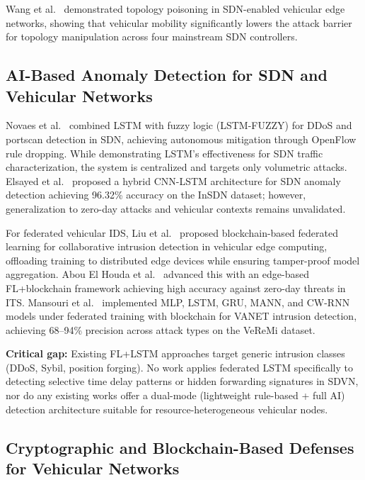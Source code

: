 \documentclass[12pt, a4paper]{report}
\begin{document}
Wang et al.~\cite{Wang2020Topology} demonstrated topology poisoning in SDN-enabled vehicular edge networks, showing that vehicular mobility significantly lowers the attack barrier for topology manipulation across four mainstream SDN controllers.

\subsection{AI-Based Anomaly Detection for SDN and Vehicular Networks}
\label{sec:ai_defense}

Novaes et al.~\cite{Novaes2020} combined LSTM with fuzzy logic (LSTM-FUZZY) for DDoS and portscan detection in SDN, achieving autonomous mitigation through OpenFlow rule dropping. While demonstrating LSTM's effectiveness for SDN traffic characterization, the system is centralized and targets only volumetric attacks. Elsayed et al.~\cite{Elsayed2021} proposed a hybrid CNN-LSTM architecture for SDN anomaly detection achieving 96.32\% accuracy on the InSDN dataset; however, generalization to zero-day attacks and vehicular contexts remains unvalidated.

For federated vehicular IDS, Liu et al.~\cite{Liu2021BFLVEC} proposed blockchain-based federated learning for collaborative intrusion detection in vehicular edge computing, offloading training to distributed edge devices while ensuring tamper-proof model aggregation. Abou El Houda et al.~\cite{AbouElHouda2024} advanced this with an edge-based FL+blockchain framework achieving high accuracy against zero-day threats in ITS. Mansouri et al.~\cite{Mansouri2024} implemented MLP, LSTM, GRU, MANN, and CW-RNN models under federated training with blockchain for VANET intrusion detection, achieving 68--94\% precision across attack types on the VeReMi dataset.

\textbf{Critical gap:} Existing FL+LSTM approaches target generic intrusion classes (DDoS, Sybil, position forging). No work applies federated LSTM specifically to detecting selective time delay patterns or hidden forwarding signatures in SDVN, nor do any existing works offer a dual-mode (lightweight rule-based + full AI) detection architecture suitable for resource-heterogeneous vehicular nodes.

\subsection{Cryptographic and Blockchain-Based Defenses for Vehicular Networks}
\label{sec:crypto_defense}
\end{document}
